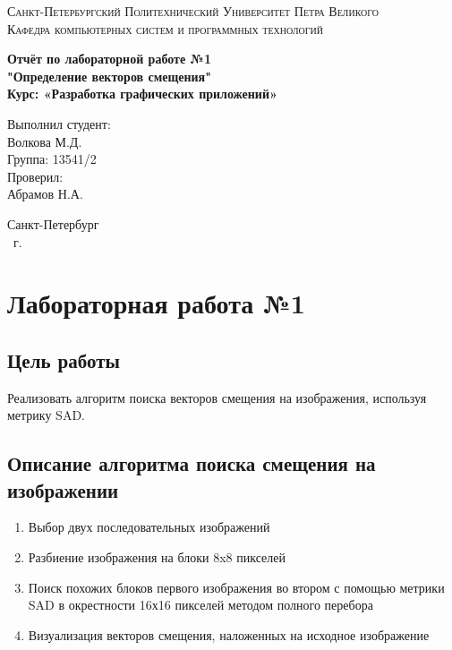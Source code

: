 \documentclass[14pt,a4paper,report]{report}
\begin{document}
\def\contentsname{Содержание}

\begin{titlepage}
	\begin{center}
		\textsc{Санкт-Петербургский Политехнический 
			Университет Петра Великого\\[5mm]
			Кафедра компьютерных систем и программных технологий}
		
		\vfill
		
		\textbf{Отчёт по лабораторной работе №1\\
		"Определение векторов смещения"\\[3mm]
			Курс: «Разработка графических приложений»\\[41mm]
		}
	\end{center}
	
	\hfill
	\begin{minipage}{.4\textwidth}
		Выполнил студент:\\[2mm] 
		Волкова М.Д.\\
		Группа: 13541/2\\[5mm]
		
		Проверил:\\[2mm] 
		Абрамов Н.А.
	\end{minipage}
	\vfill
	\begin{center}
		Санкт-Петербург\\ \the\year\ г.
	\end{center}
\end{titlepage}

\tableofcontents
\clearpage

\chapter{Лабораторная работа №1}

\section{Цель работы}

Реализовать алгоритм поиска векторов смещения на изображения, используя метрику SAD. 

\section{Описание алгоритма поиска смещения на изображении}

\begin{enumerate}
\item Выбор двух последовательных изображений
\item Разбиение изображения на блоки 8x8 пикселей
\item Поиск похожих блоков первого изображения во втором с помощью метрики SAD в окрестности 16х16 пикселей методом полного перебора
\item Визуализация векторов смещения, наложенных на исходное изображение
\end{enumerate}
\end{document}
